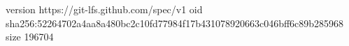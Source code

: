 version https://git-lfs.github.com/spec/v1
oid sha256:52264702a4aa8a480bc2c10fd77984f17b431078920663c046bff6c89b285968
size 196704
